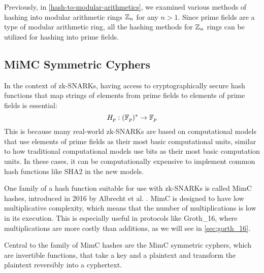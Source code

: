 Previously, in \ref{hash-to-modular-arithmetics}, we examined various methods of hashing into modular arithmetic rings $\mathbb{Z}_n$ for any $n>1$. Since prime fields are a type of modular arithmetic ring, all the hashing methods for $\mathbb{Z}_n$ rings can be utilized for hashing into prime fields.


\subsection{MiMC Symmetric Cyphers} 
In the context of zk-SNARKs, having access to cryptographically secure hash functions that map strings of elements from prime fields to elements of prime fields is essential:
\begin{equation}
H_p : (\mathbb{F}_p)^* \to \mathbb{F}_p
\end{equation}
This is because many real-world zk-SNARKs are based on computational models that use elements of prime fields as their most basic computational units, similar to how traditional computational models use bits as their most basic computation units. In these cases, it can be computationally expensive to implement common hash functions like SHA2 in the new models.

One family of a hash function suitable for use with zk-SNARKs is called MimC hashes, introduced in 2016 by Albrecht et al. \cite{albrecht-16}. MimC is designed to have low multiplicative complexity, which means that the number of multiplications is low in its execution. This is especially useful in protocols like Groth\_16, where multiplications are more costly than additions, as we will see in \ref{sec:gorth_16}.

Central to the family of MimC hashes are the MimC symmetric cyphers, which are invertible functions, that take a key and a plaintext and transform the plaintext reversibly into a cyphertext. 

